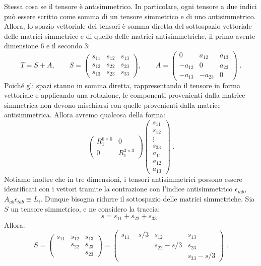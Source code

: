 Stessa cosa se il tensore è antisimmetrico. In particolare, ogni tensore a due indici può essere scritto come somma di un tensore 
simmetrico e di uno antisimmetrico. Allora, lo spazio vettoriale dei tensori è somma diretta del sottospazio vettoriale delle matrici 
simmetrice e di quello delle matrici antisimmetriche, il primo avente dimensione 6 e il secondo 3:
\begin{equation}
T=S+A,\qquad S=\begin{pmatrix}
s_{11} & s_{12} & s_{13} \\
s_{12} & s_{22} & s_{23} \\
s_{13} & s_{23} & s_{33}
\end{pmatrix},\qquad A=\begin{pmatrix}
0 & a_{12} & a_{13} \\
-a_{12} & 0 & a_{23} \\
-a_{13} & -a_{23} & 0
\end{pmatrix}\;.
\end{equation}
Poiché gli spazi stanno in somma diretta, rappresentando il tensore in forma vettoriale e applicando una rotazione, le componenti 
provenienti dalla matrice simmetrica non devono mischiarsi con quelle provenienti dalla matrice antisimmetrica. Allora avremo qualcosa 
della forma:
\begin{equation}
\begin{pmatrix}
R_1^{6\times 6} & 0 \\
0 & R_1^{3\times 3}
\end{pmatrix}\begin{pmatrix}
s_{11} \\
s_{12} \\
\vdots \\
s_{33} \\
a_{11} \\
a_{12} \\
a_{13}
\end{pmatrix}\;.
\end{equation}
Notiamo inoltre che in tre dimensioni, i tensori antisimmetrici possono essere identificati con i vettori tramite la contrazione con 
l'indice antisimmetrico $\epsilon_{iab}$, $A_{ab}\epsilon_{iab}\equiv L_i$. Dunque bisogna ridurre il sottospazio delle matrici simmetriche. Sia $S$ un tensore simmetrico, e ne considero la traccia:
\begin{equation}
s= s_{11}+s_{22}+s_{33}\;.
\end{equation}
Allora:
\begin{equation}
S=\begin{pmatrix}
s_{11} & s_{12} & s_{13} \\
{} & s_{22} & s_{23} \\
{} & {} & s_{23}
\end{pmatrix}=\begin{pmatrix}
s_{11}-s/3 & s_{12} & s_{13} \\
{} & s_{22}-s/3 & s_{23} \\
{} & {} & s_{33}-s/3
\end{pmatrix}\;.
\end{equation}
